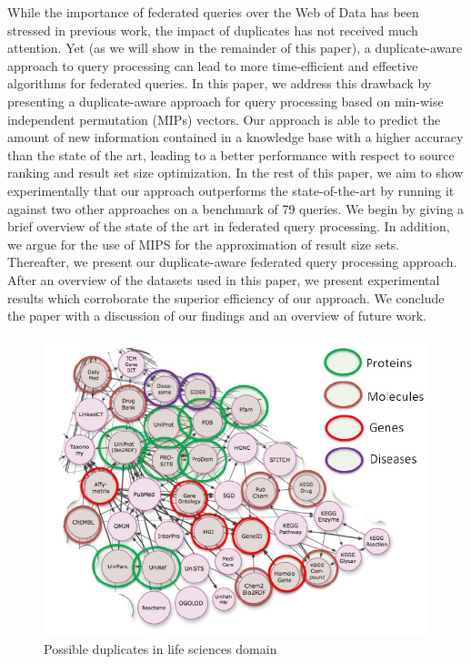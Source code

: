 \documentclass{sig-alternate}  %
\begin{document}
While the importance of federated queries over the Web of Data has been stressed in previous work, the impact of duplicates has not received much attention.
Yet (as we will show in the remainder of this paper), a duplicate-aware approach to query processing can lead to more time-efficient and effective algorithms for federated queries.
In this paper, we address this drawback by presenting a duplicate-aware approach for query processing based on min-wise independent permutation (MIPs) vectors.
Our approach is able to predict the amount of new information contained in a knowledge base with a higher accuracy than the state of the art, leading to a better performance with respect to source ranking and result set size optimization. 
In the rest of this paper, we aim to show experimentally that our approach outperforms the state-of-the-art by running it against two other approaches on a benchmark of 79 queries. 
We begin by giving a brief overview of the state of the art in federated query processing.
In addition, we argue for the use of MIPS for the approximation of result size sets.
Thereafter, we present our duplicate-aware federated query processing approach.
After an overview of the datasets used in this paper, we present experimental results which corroborate the superior efficiency of our approach.
We conclude the paper with a discussion of our findings and an overview of future work.
\begin{figure}
\begin{centering}
\includegraphics[scale=0.70]{img/possibleDuplicates} 
\par\end{centering}

\centering{}\caption{Possible duplicates in life sciences domain}
\end{figure}
\end{document}
